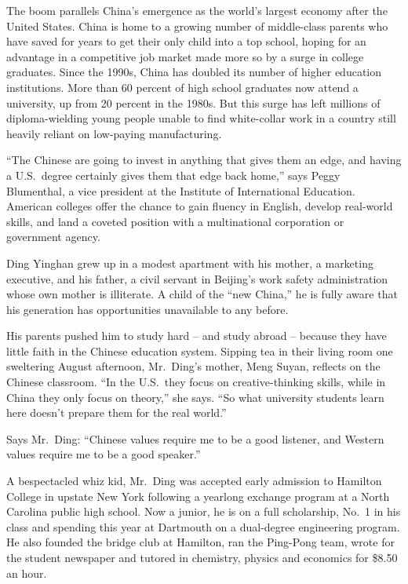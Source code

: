 ﻿\documentclass[12pt]{article}
\begin{document}
The boom parallels China's emergence as the world's largest economy after the United States. China
is home to a growing number of middle-class parents who have saved for years to get their only child
into a top school, hoping for an advantage in a competitive job market made more so by a surge in
college graduates. Since the 1990s, China has doubled its number of higher education institutions.
More than 60 percent of high school graduates now attend a university, up from 20 percent in the
1980s. But this surge has left millions of diploma-wielding young people unable to find white-collar
work in a country still heavily reliant on low-paying manufacturing.

``The Chinese are going to invest in anything that gives them an edge, and having a U.S.~degree
certainly gives them that edge back home,'' says Peggy Blumenthal, a vice president at the Institute
of International Education. American colleges offer the chance to gain fluency in English, develop
real-world skills, and land a coveted position with a multinational corporation or government
agency.

Ding Yinghan grew up in a modest apartment with his mother, a marketing executive, and his father, a
civil servant in Beijing's work safety administration whose own mother is illiterate. A child of the
``new China,'' he is fully aware that his generation has opportunities unavailable to any before.

His parents pushed him to study hard -- and study abroad -- because they have little faith in the
Chinese education system. Sipping tea in their living room one sweltering August afternoon,
Mr.~Ding's mother, Meng Suyan, reflects on the Chinese classroom. ``In the U.S.~they focus on
creative-thinking skills, while in China they only focus on theory,'' she says. ``So what university
students learn here doesn't prepare them for the real world.''

Says Mr.~Ding: ``Chinese values require me to be a good listener, and Western values require me to
be a good speaker.''

A bespectacled whiz kid, Mr.~Ding was accepted early admission to Hamilton College in upstate New
York following a yearlong exchange program at a North Carolina public high school. Now a junior, he
is on a full scholarship, No.~1 in his class and spending this year at Dartmouth on a dual-degree
engineering program. He also founded the bridge club at Hamilton, ran the Ping-Pong team, wrote for
the student newspaper and tutored in chemistry, physics and economics for \$8.50 an hour.
\end{document}
